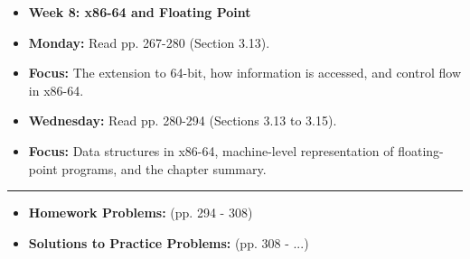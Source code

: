 \documentclass[11pt,a4paper]{report}
\begin{document}
\begin{itemize}
  \item \textbf{Week 8: x86-64 and Floating Point}
  \item \textbf{Monday:} Read pp. 267-280 (Section 3.13).
  \item \textbf{Focus:} The extension to 64-bit, how information is accessed, and control flow in x86-64.
  \item \textbf{Wednesday:} Read pp. 280-294 (Sections 3.13 to 3.15).
  \item \textbf{Focus:} Data structures in x86-64, machine-level representation of floating-point programs, and the chapter summary.

\end{itemize}
\noindent\rule{\textwidth}{0.4pt}
\begin{itemize}
  \item \textbf{Homework Problems:} (pp. 294 - 308)
  \item \textbf{Solutions to Practice Problems:} (pp. 308 - ...)

\end{itemize}
\newpage
\end{document}
